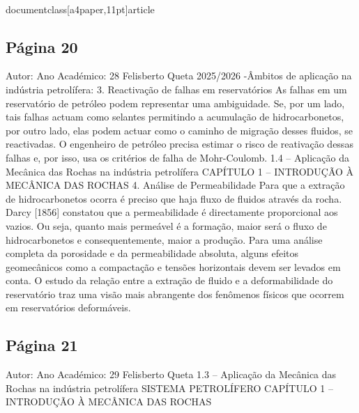 \\documentclass[a4paper,11pt]{article}
\begin{document}
\subsection*{Página 20}
Autor:
Ano Académico:
28
Felisberto Queta
2025/2026
-Âmbitos de aplicação na indústria petrolífera:
3. Reactivação de falhas em reservatórios
As falhas em um reservatório de petróleo podem representar uma ambiguidade.
Se, por um lado, tais falhas actuam como selantes permitindo a acumulação de hidrocarbonetos, por outro lado, 
elas podem actuar como o caminho de migração desses fluidos, se reactivadas.
O engenheiro de petróleo precisa estimar o risco de reativação dessas falhas e, por isso, usa os critérios de falha 
de Mohr-Coulomb.
1.4 – Aplicação da Mecânica das Rochas na indústria petrolífera
CAPÍTULO 1 – INTRODUÇÃO À MECÂNICA DAS ROCHAS     
4. Análise de Permeabilidade
Para que a extração de hidrocarbonetos ocorra é preciso que haja fluxo de fluidos através da rocha. Darcy [1856]
constatou que a permeabilidade é directamente proporcional aos vazios. Ou seja, quanto mais permeável é a
formação, maior será o fluxo de hidrocarbonetos e consequentemente, maior a produção.
Para uma análise completa da porosidade e da permeabilidade absoluta, alguns efeitos geomecânicos como a
compactação e tensões horizontais devem ser levados em conta.
O estudo da relação entre a extração de fluido e a deformabilidade do reservatório traz uma visão mais
abrangente dos fenômenos físicos que ocorrem em reservatórios deformáveis.



\subsection*{Página 21}
Autor:
Ano Académico:
29
Felisberto Queta
1.3 – Aplicação da Mecânica das Rochas na indústria petrolífera
SISTEMA PETROLÍFERO
CAPÍTULO 1 – INTRODUÇÃO À MECÂNICA DAS ROCHAS
\end{document}
